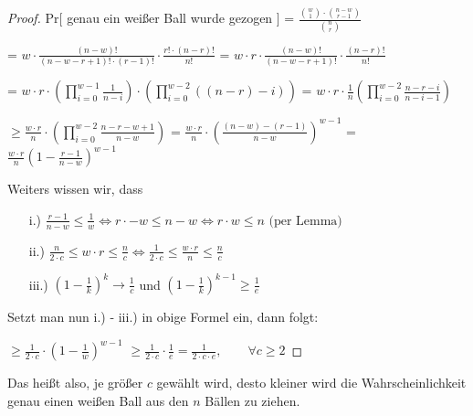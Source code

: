 \documentclass{article}
\begin{document}
\begin{proof}
  Pr[ genau ein wei{\ss}er Ball wurde gezogen ]
    = $\frac{\binom{w}{1} \cdot \binom{n - w}{r - 1}}{\binom{n}{r}}$

    = $w \cdot \frac{(n - w)!}{(n - w - r + 1)! \cdot (r - 1)!} \cdot \frac{r! \cdot (n - r)!}{n!}$
    = $w \cdot r \cdot \frac{(n - w)!}{(n - w - r + 1)!} \cdot \frac{(n - r)!}{n!}$

    = $w \cdot r \cdot \left( \prod\limits_{i = 0}^{w - 1} \frac{1}{n - i} \right) \cdot \left( \prod\limits_{i = 0}^{w - 2} \left( \left( n - r \right) - i \right) \right)$
    = $w \cdot r \cdot \frac{1}{n} \left( \prod\limits_{i = 0}^{w - 2} \frac{n - r - i}{n - i - 1} \right)$

    $\geq \frac{w \cdot r}{n} \cdot \left( \prod\limits_{i = 0}^{w - 2} \frac{n - r - w + 1}{n - w} \right)$
    = $\frac{w \cdot r}{n} \cdot \left( \frac{\left( n - w \right) - \left( r - 1 \right)}{n - w} \right)^{w - 1}$
    = $\frac{w \cdot r}{n} \left( 1 - \frac{r - 1}{n - w} \right)^{w - 1}$
   
  \bigskip
  \noindent
  Weiters wissen wir, dass
  \begin{enumerate}
    \item[i.)] $\frac{r - 1}{n - w} \leq \frac{1}{w}
        \Longleftrightarrow r \cdot  - w \leq n - w
        \Longleftrightarrow r \cdot w \leq n \text{ (per Lemma)}
      $
    \item[ii.)] $\frac{n}{2 \cdot c} \leq w \cdot r \leq \frac{n}{c}
        \Longleftrightarrow \frac{1}{2 \cdot c} \leq \frac{w \cdot r}{n} \leq \frac{n}{c}
      $
    \item[iii.)] $\left( 1 - \frac{1}{k} \right)^k \rightarrow \frac{1}{c}$ und
      $\left( 1 - \frac{1}{k} \right)^{k - 1} \geq \frac{1}{e}$
  \end{enumerate}

  \bigskip
  \noindent
  Setzt man nun i.) - iii.) in obige Formel ein, dann folgt:

  $\geq \frac{1}{2 \cdot c} \cdot \left( 1 - \frac{1}{w} \right)^{w - 1}$
  $\geq \frac{1}{2 \cdot c} \cdot \frac{1}{e} = \frac{1}{2 \cdot c \cdot e},
    \qquad \forall c \geq 2
  $
\end{proof}

\noindent
Das hei{\ss}t also, je gr{\"o}{\ss}er $c$ gew{\"a}hlt wird, desto kleiner wird die
Wahrscheinlichkeit genau einen wei{\ss}en Ball aus den $n$ B{\"a}llen zu ziehen.
\end{document}
